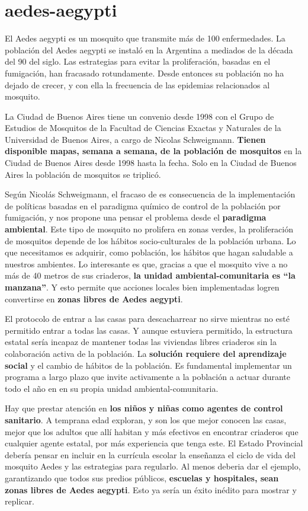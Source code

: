 \section{aedes-aegypti}\label{aedes-aegypti}

El Aedes aegypti es un mosquito que transmite más de 100 enfermedades.
La población del Aedes aegypti se instaló en la Argentina a mediados de
la década del 90 del siglo. Las estrategias para evitar la
proliferación, basadas en el fumigación, han fracasado rotundamente.
Desde entonces su población no ha dejado de crecer, y con ella la
frecuencia de las epidemias relacionados al mosquito.

La Ciudad de Buenos Aires tiene un convenio desde 1998 con el Grupo de
Estudios de Mosquitos de la Facultad de Ciencias Exactas y Naturales de
la Universidad de Buenos Aires, a cargo de Nicolas Schweigmann.
\textbf{Tienen disponible mapas, semana a semana, de la población de
mosquitos} en la Ciudad de Buenos Aires desde 1998 hasta la fecha. Solo
en la Ciudad de Buenos Aires la población de mosquitos se triplicó.

Según Nicolás Schweigmann, el fracaso de es consecuencia de la
implementación de políticas basadas en el paradigma químico de control
de la población por fumigación, y nos propone una pensar el problema
desde el \textbf{paradigma ambiental}. Este tipo de mosquito no
prolifera en zonas verdes, la proliferación de mosquitos depende de los
hábitos socio-culturales de la población urbana. Lo que necesitamos es
adquirir, como población, los hábitos que hagan saludable a nuestros
ambientes. Lo interesante es que, gracias a que el mosquito vive a no
más de 40 metros de sus criaderos, \textbf{la unidad
ambiental-comunitaria es ``la manzana''}. Y esto permite que acciones
locales bien implementadas logren convertirse en \textbf{zonas libres de
Aedes aegypti}.

El protocolo de entrar a las casas para descacharrear no sirve mientras
no esté permitido entrar a todas las casas. Y aunque estuviera
permitido, la estructura estatal sería incapaz de mantener todas las
viviendas libres criaderos sin la colaboración activa de la población.
La \textbf{solución requiere del aprendizaje social} y el cambio de
hábitos de la población. Es fundamental implementar un programa a largo
plazo que invite activamente a la población a actuar durante todo el año
en en su propia unidad ambiental-comunitaria.

Hay que prestar atención en \textbf{los niños y niñas como agentes de
control sanitario}. A temprana edad exploran, y son los que mejor
conocen las casas, mejor que los adultos que allí habitan y más
efectivos en encontrar criaderos que cualquier agente estatal, por más
experiencia que tenga este. El Estado Provincial debería pensar en
incluir en la currícula escolar la enseñanza el ciclo de vida del
mosquito Aedes y las estrategias para regularlo. Al menos deberia dar el
ejemplo, garantizando que todos sus predios públicos, \textbf{escuelas y
hospitales, sean zonas libres de Aedes aegypti}. Esto ya sería un éxito
inédito para mostrar y replicar.


